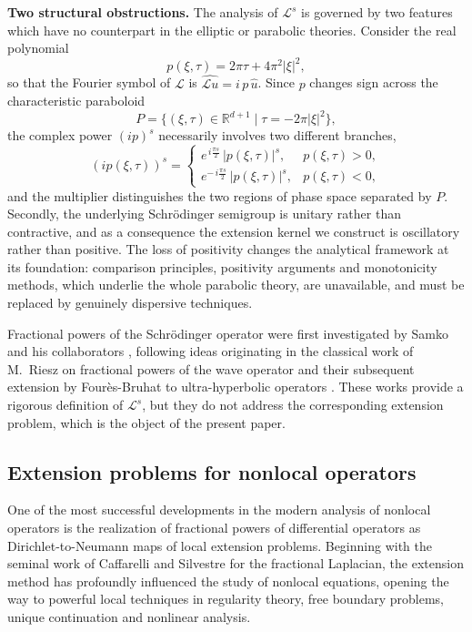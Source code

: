\documentclass[11pt,letter]{amsart}
\numberwithin{equation}{section}
\newcommand{\Le}{\mathcal L}
\numberwithin{equation}{section}
\begin{document}
\medskip
\noindent\textbf{Two structural obstructions.} The analysis of $\Le^s$ is governed by two features which have no
counterpart in the elliptic or parabolic theories. Consider the real polynomial
\[
p(\xi,\tau)=2\pi\tau+4\pi^2|\xi|^2,
\]
so that the Fourier symbol of $\Le$ is $\widehat{\Le u}=i\,p\,\widehat u$. Since
$p$ changes sign across the characteristic paraboloid
\[
P=\{(\xi,\tau)\in\mathbb R^{d+1}\mid \tau = - 2\pi|\xi|^2\},
\]
the complex power $(ip)^s$ necessarily involves two different branches,
\[
(ip(\xi,\tau))^s=
\begin{cases}
e^{\,i\frac{\pi s}{2}}\,|p(\xi,\tau)|^s, & p(\xi,\tau)>0,
\\[2mm]
e^{-\,i\frac{\pi s}{2}}\,|p(\xi,\tau)|^s, & p(\xi,\tau)<0,
\end{cases}
\]
and the multiplier distinguishes the two regions of phase space separated
by $P$. Secondly, the underlying Schr\"odinger semigroup is unitary rather
than contractive, and as a consequence the extension kernel we construct is
oscillatory rather than positive. The loss of positivity changes the analytical
framework at its foundation: comparison principles, positivity arguments and
monotonicity methods, which underlie the whole parabolic theory, are
unavailable, and must be replaced by genuinely dispersive techniques.

Fractional powers of the Schr\"odinger operator were first investigated by
Samko and his collaborators \cite{Sa,CN,NS}, following ideas originating in the
classical work of M.~Riesz on fractional powers of the wave operator and their
subsequent extension by Four\`es-Bruhat to ultra-hyperbolic operators
\cite{R2,FB}. These works provide a rigorous definition of $\mathcal L^s$, but
they do not address the corresponding extension problem, which is the object of
the present paper.


\subsection{Extension problems for nonlocal operators}\label{S:epnonlocal}

One of the most successful developments in the modern analysis of nonlocal
operators is the realization of fractional powers of differential operators as
Dirichlet-to-Neumann maps of local extension problems. Beginning with the
seminal work of Caffarelli and Silvestre \cite{CS} for the fractional Laplacian,
the extension method has profoundly influenced the study of nonlocal equations,
opening the way to powerful local techniques in regularity theory, free boundary
problems, unique continuation and nonlinear analysis.
\end{document}

